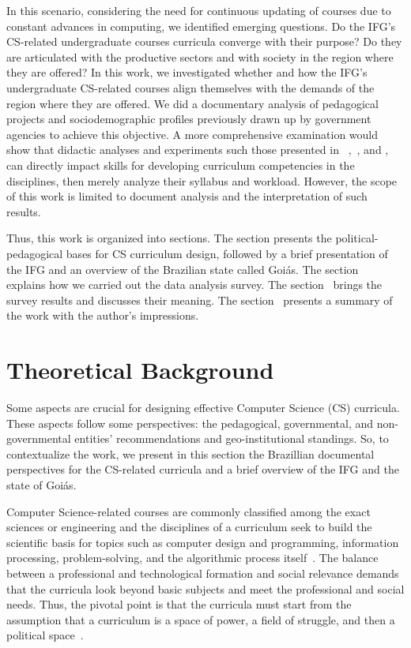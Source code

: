 \documentclass[sigconf, review]{educomp}
\begin{document}
In this scenario, considering the need for continuous updating of courses due to constant advances in computing, we identified emerging questions.
Do the IFG's CS-related undergraduate courses curricula converge with their purpose? 
Do they are articulated with the productive sectors and with society in the region where they are offered?
In this work, we investigated whether and how the IFG's undergraduate CS-related courses align themselves with the demands of the region where they are offered.
We did a documentary analysis of pedagogical projects and sociodemographic profiles previously drawn up by government agencies to achieve this objective.
A more comprehensive examination would show that didactic analyses and experiments such those presented in ~\cite{educompA},~\cite{ duran2018towards}, and \cite{massa2021docentes}, can directly impact skills for developing curriculum competencies in the disciplines, then merely analyze their syllabus and workload.
However, the scope of this work is limited to document analysis and the interpretation of such results.

Thus, this work is organized into sections. 
The  section presents the political-pedagogical bases for CS curriculum design, followed by a brief presentation of the IFG and an overview of the Brazilian state called Goiás. 
The section~ explains how we carried out the data analysis survey. 
The section~ brings the survey results and discusses their meaning. 
The section~ presents a summary of the work with the author's impressions.

\section{Theoretical Background}\label{TheoreticalBackground}
Some aspects are crucial for designing effective Computer Science (CS) curricula.
These aspects follow some perspectives: the pedagogical, governmental, and non-governmental entities' recommendations and geo-institutional standings.
So, to contextualize the work, we present in this section the Brazillian documental perspectives for the CS-related curricula and a brief overview of the IFG and the state of Goiás.

Computer Science-related courses are commonly classified among the exact sciences or engineering and the disciplines of a curriculum seek to build the scientific basis for topics such as computer design and programming, information processing, problem-solving, and the algorithmic process itself~\cite{brookshear2013ciencia}.
The balance between a professional and technological formation and social relevance demands that the curricula look beyond basic subjects and meet the professional and social needs.
Thus, the pivotal point is that the curricula must start from the assumption that a curriculum is a space of power, a field of struggle, and then a political space~\cite{hornburg2007teorias}.
\end{document}
